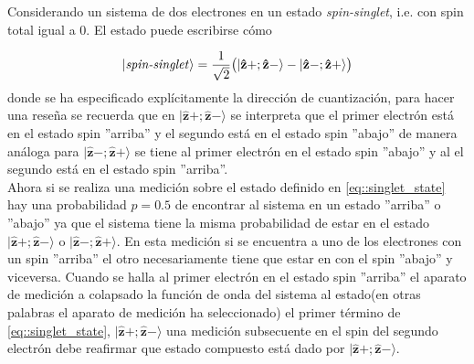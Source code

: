 \documentclass[a4paper]{article}
\begin{document}
Considerando un sistema de dos electrones en un estado \textit{spin-singlet}, i.e. con spin total igual a $0$. El estado puede escribirse cómo 

\begin{equation}\label{eq::singlet_state}
|\text{\textit{spin-singlet}}\rangle=\frac{1}{\sqrt{2}}\big( |\mathbf{\hat{z}}+;\mathbf{\hat{z}}-\rangle -|\mathbf{\hat{z}}-;\mathbf{\hat{z}}+\rangle  \big)
\end{equation}
donde se ha especificado explícitamente la dirección de cuantización, para hacer una reseña se recuerda que en $|\mathbf{\hat{z}}+;\mathbf{\hat{z}}-\rangle$ se interpreta que el primer electrón está en el estado spin ''arriba'' y el segundo está en el estado spin ''abajo'' de manera análoga para $|\mathbf{\hat{z}}-;\mathbf{\hat{z}}+\rangle$ se tiene al primer electrón en el estado spin ''abajo'' y al el segundo está en el estado spin ''arriba''.\\
Ahora si se realiza una medición sobre el estado definido en \ref{eq::singlet_state} hay una probabilidad $p=0.5$ de encontrar al sistema en un estado ''arriba''  o ''abajo'' ya que el sistema tiene la misma probabilidad de estar en el estado $|\mathbf{\hat{z}}+;\mathbf{\hat{z}}-\rangle$ o $|\mathbf{\hat{z}}-;\mathbf{\hat{z}}+\rangle$. En esta medición si se encuentra a uno de los electrones con un spin ''arriba'' el otro necesariamente tiene que estar en con el spin ''abajo'' y viceversa. Cuando se halla al primer electrón en el estado spin ''arriba'' el aparato de medición a colapsado la función de onda del sistema al estado(en otras palabras el aparato de medición ha seleccionado) el primer término de \ref{eq::singlet_state}, $|\mathbf{\hat{z}}+;\mathbf{\hat{z}}-\rangle$ una medición subsecuente en el spin del segundo electrón debe reafirmar que estado compuesto está dado por $|\mathbf{\hat{z}}+;\mathbf{\hat{z}}-\rangle$.\\
\end{document}
